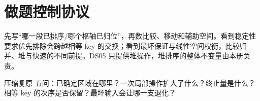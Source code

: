 \documentclass[UTF8,fontset=none,11pt,a4paper]{ctexart}
\begin{document}
\section{做题控制协议}
先写“哪一段已排序/哪个枢轴已归位”，再数比较、移动和辅助空间。看到稳定性要求优先排除会跨越相等 key 的交换；看到最坏保证与线性空间权衡，比较归并、堆与快速的不同前提。DS05 只提供堆操作，堆排序的整体不变量由本册负责。
\begin{corebox}{压缩复原}
五问：已确定区域在哪里？一次局部操作扩大了什么？终止量是什么？相等 key 的次序是否保留？最坏输入会让哪一支退化？
\end{corebox}
\end{document}
